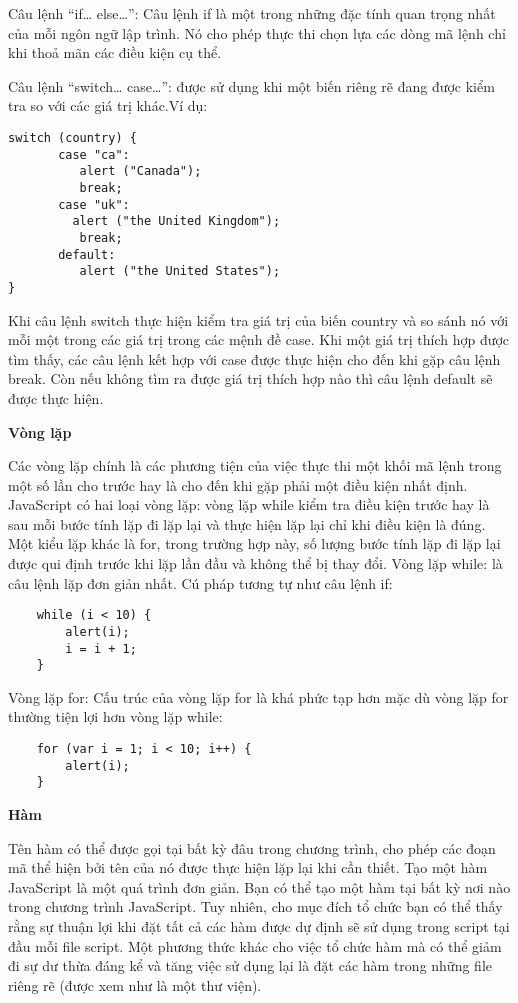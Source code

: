 Câu lệnh “if… else…”: Câu lệnh if là một trong những đặc tính quan trọng nhất của mỗi  ngôn ngữ lập trình. Nó cho phép thực thi chọn lựa các dòng mã lệnh chỉ khi thoả mãn các điều kiện cụ thể.
  
Câu lệnh “switch… case…”: được sử dụng khi một biến riêng rẽ đang được kiểm tra so với các giá trị khác.Ví dụ:

\begin{lstlisting}
switch (country) { 
       case "ca": 
          alert ("Canada"); 
          break; 
       case "uk": 
         alert ("the United Kingdom"); 
          break; 
       default:  
          alert ("the United States"); 
}
\end{lstlisting}


Khi câu lệnh switch thực hiện kiểm tra giá trị của biến country và so sánh nó với mỗi một trong các giá trị trong các mệnh đề case. Khi một giá trị thích hợp được tìm thấy, các câu lệnh kết hợp với case được thực hiện cho đến khi gặp câu lệnh break. Còn nếu không tìm ra được giá trị thích hợp nào thì câu lệnh default sẽ được thực hiện.

\textbf{Vòng lặp}  

Các vòng lặp chính là các phương tiện của việc thực thi một khối mã lệnh trong một số lần cho trước hay là cho đến khi gặp phải một điều kiện nhất định. 
JavaScript có hai loại vòng lặp: vòng lặp while kiểm tra điều kiện trước hay là sau mỗi bước tính lặp đi lặp lại và thực hiện lặp lại chỉ khi điều kiện là đúng. Một kiểu lặp khác là for, trong trường hợp này, số lượng bước tính lặp đi lặp lại được qui định trước khi lặp lần đầu và không thể bị thay đổi.  
Vòng lặp while: là câu lệnh lặp đơn giản nhất. Cú pháp tương tự như câu lệnh if:

\begin{lstlisting}
	while (i < 10) {
	    alert(i);
	    i = i + 1;
	}
\end{lstlisting} 

Vòng lặp for: Cấu trúc của vòng lặp for là khá phức tạp hơn mặc dù vòng lặp for thường tiện lợi hơn vòng lặp while:

\begin{lstlisting}
	for (var i = 1; i < 10; i++) {
	    alert(i);
	}
\end{lstlisting}


\textbf{Hàm}

Tên hàm có thể được gọi tại bất kỳ đâu trong chương trình, cho phép các đoạn mã thể hiện bởi tên của nó được thực hiện lặp lại khi cần thiết. Tạo một hàm JavaScript là một quá trình đơn giản. Bạn có thể tạo một hàm tại bất kỳ nơi nào trong chương trình JavaScript. Tuy nhiên, cho mục đích tổ chức bạn có thể thấy rằng sự thuận lợi khi đặt tất cả các hàm được dự định sẽ sử dụng trong script tại đầu mỗi file script. Một phương thức khác cho việc tổ chức hàm mà có thể giảm đi sự dư thừa đáng kể và tăng việc sử dụng lại là đặt các hàm trong những file riêng rẽ (được xem như là một thư viện).
    
